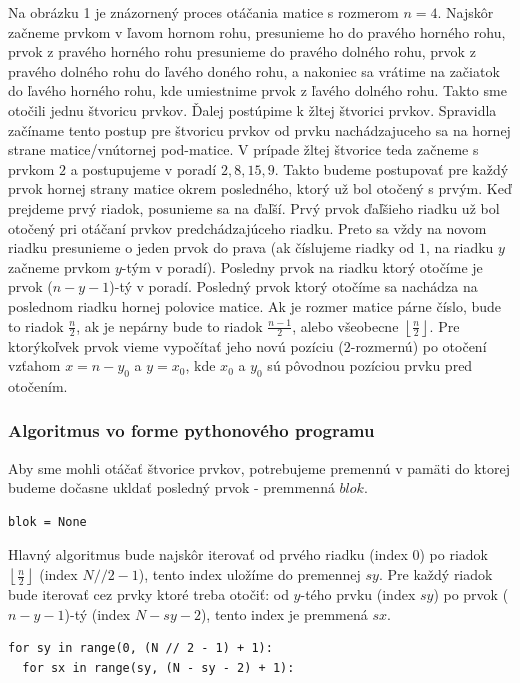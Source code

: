 \documentclass{article}
\begin{document}
Na obrázku 1 je znázornený proces otáčania matice s rozmerom $n = 4$. Najskôr začneme prvkom v ľavom hornom rohu, presunieme ho do pravého horného rohu, prvok z pravého horného rohu presunieme do pravého dolného rohu, prvok z pravého dolného rohu do ľavého doného rohu, a nakoniec sa vrátime na začiatok do ľavého horného rohu, kde umiestnime prvok z ľavého dolného rohu. Takto sme otočili jednu štvoricu prvkov. Ďalej postúpime k žltej štvorici prvkov. Spravidla začíname tento postup pre štvoricu prvkov od prvku nachádzajuceho sa na hornej strane matice/vnútornej pod-matice. V prípade žltej štvorice teda začneme s prvkom $2$ a postupujeme v poradí $2, 8, 15, 9$. Takto budeme postupovať pre každý prvok hornej strany matice okrem posledného, ktorý už bol otočený s prvým. Keď prejdeme prvý riadok, posunieme sa na ďaľší. Prvý prvok ďaľšieho riadku už bol otočený pri otáčaní prvkov predchádzajúceho riadku. Preto sa vždy na novom riadku presunieme o jeden prvok do prava (ak číslujeme riadky od $1$, na riadku $y$ začneme prvkom $y$-tým v poradí). Posledny prvok na riadku ktorý otočíme je prvok ($n - y - 1$)-tý v poradí. Posledný prvok ktorý otočíme sa nachádza na poslednom riadku hornej polovice matice. Ak je rozmer matice párne číslo, bude to riadok $\frac{n}{2}$, ak je nepárny bude to riadok $\frac{n - 1}{2}$, alebo všeobecne $\left \lfloor \frac{n}{2} \right \rfloor$. Pre ktorýkoľvek prvok vieme vypočítať jeho novú pozíciu ($2$-rozmernú) po otočení vzťahom $x = n - y_0$ a $y = x_0$, kde $x_0$ a $y_0$ sú pôvodnou pozíciou prvku pred otočením.

\subsubsection*{Algoritmus vo forme pythonového programu}

Aby sme mohli otáčať štvorice prvkov, potrebujeme premennú v pamäti do ktorej budeme dočasne ukldať posledný prvok - premmenná $blok$.

\begin{verbatim}
blok = None
\end{verbatim}

Hlavný algoritmus bude najskôr iterovať od prvého riadku (index $0$) po riadok $\left\lfloor\frac{n}{2}\right\rfloor$ (index $N // 2 - 1$), tento index uložíme do premennej $sy$. Pre každý riadok bude iterovať cez prvky ktoré treba otočiť: od $y$-tého prvku (index $sy$) po prvok ($n - y - 1$)-tý (index $N - sy - 2$), tento index je premmená $sx$.

\begin{verbatim}
for sy in range(0, (N // 2 - 1) + 1):
  for sx in range(sy, (N - sy - 2) + 1):
\end{verbatim}
\end{document}
